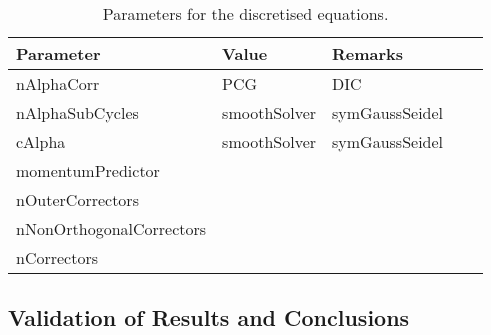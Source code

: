 \begin{table}[h!]
	\begin{tabular}{@{}lllll@{}}
		\toprule[1pt]
		\textbf{Parameter} & \textbf{Value} & \textbf{Remarks} & \\ \midrule[2pt]
		nAlphaCorr & PCG & DIC &  \\
		nAlphaSubCycles & smoothSolver & symGaussSeidel  &  \\
		cAlpha & smoothSolver & symGaussSeidel  &  \\
		momentumPredictor &      &    &  \\		 
		nOuterCorrectors &     &    &  \\ 
		nNonOrthogonalCorrectors &     &    &  \\ 		
		nCorrectors &    			       &    &  \\ \bottomrule[1pt]		
	\end{tabular}
	\centering
	\caption{Parameters for the discretised equations.}	
	\label{fig:boat5}
\end{table}
\subsection{Validation of Results and Conclusions}